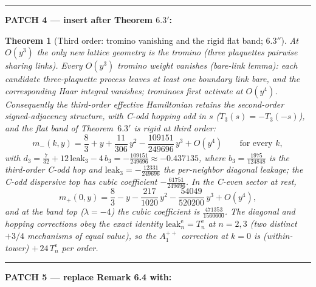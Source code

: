 \documentclass[11pt]{article}
\newtheorem{theorem}{Theorem}[section]
\begin{document}
\medskip\hrule\medskip
\noindent\textbf{PATCH 4 --- insert after Theorem $6.3'$:}

\begin{theorem}[Third order: tromino vanishing and the rigid flat band;
$6.3''$]\label{thm:63dprime}
At $O(y^3)$ the only new lattice geometry is the tromino (three plaquettes
pairwise sharing links). \emph{Every $O(y^3)$ tromino weight vanishes}
(bare-link lemma): each candidate three-plaquette process leaves at least one
boundary link bare, and the corresponding Haar integral vanishes; trominoes
first activate at $O(y^4)$. Consequently the third-order effective
Hamiltonian retains the second-order signed-adjacency structure, with C-odd
hopping odd in $s$ ($T_3(s)=-T_3(-s)$), and the flat band of
Theorem~$6.3'$ is rigid at third order:
\begin{equation}
m_-(k,y)=\frac83+y+\frac{11}{306}\,y^2-\frac{109151}{249696}\,y^3+O(y^4)
\qquad\text{for every }k,
\tag{$23''''$}
\end{equation}
with $d_3=\tfrac{7}{32}+12\,\mathrm{leak}_3-4\,b_3=-\tfrac{109151}{249696}
\approx-0.437135$, where $b_3=\tfrac{1975}{124848}$ is the third-order C-odd
hop and $\mathrm{leak}_3=-\tfrac{12331}{249696}$ the per-neighbor diagonal
leakage; the C-odd dispersive top has cubic coefficient
$-\tfrac{61751}{249696}$. In the C-even sector at rest,
\begin{equation}
m_+(0,y)=\frac83-y-\frac{217}{1020}\,y^2-\frac{54049}{520200}\,y^3+O(y^4),
\tag{$23'''''$}
\end{equation}
and at the band top ($\lambda=-4$) the cubic coefficient is
$\tfrac{471353}{1560600}$. The diagonal and hopping corrections obey the
exact identity $\mathrm{leak}^{\mathrm e}_n=T^{\mathrm e}_n$ at $n=2,3$ (two
distinct $+3/4$ mechanisms of equal value), so the $A_1^{++}$ correction at
$k=0$ is (within-tower) $+\,24\,T^{\mathrm e}_n$ per order.
\end{theorem}

\medskip\hrule\medskip
\noindent\textbf{PATCH 5 --- replace Remark 6.4 with:}
\end{document}
